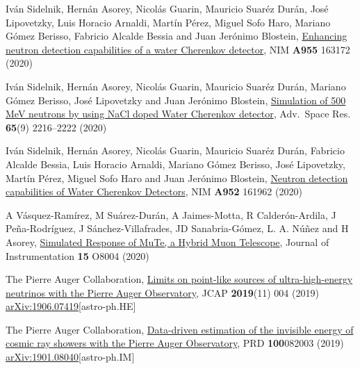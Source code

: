 \begin{etaremune}
\item {} Iván Sidelnik, Hernán Asorey, Nicolás Guarin, Mauricio Suaréz Durán, José Lipovetzky, Luis Horacio Arnaldi, Martín Pérez, Miguel Sofo Haro, Mariano Gómez Berisso, Fabricio Alcalde Bessia and Juan Jerónimo Blostein, \href{https://doi.org/10.1016/j.nima.2019.163172}{{Enhancing neutron detection capabilities of a water Cherenkov detector}}, NIM {\textbf{A955}} 163172 (2020) %
	
\item {} Iván Sidelnik, Hernán Asorey, Nicolás Guarin, Mauricio Suaréz Durán, Mariano Gómez Berisso, José Lipovetzky and Juan Jerónimo Blostein, \href{https://doi.org/10.1016/j.asr.2020.02.024}{{Simulation of 500 MeV neutrons by using NaCl doped Water Cherenkov detector}}, Adv.\ Space Res. {\textbf{65}}(9) 2216--2222 (2020) %

\item {} Iván Sidelnik, Hernán Asorey, Nicolás Guarin, Mauricio Suaréz Durán, Fabricio Alcalde Bessia, Luis Horacio Arnaldi, Mariano Gómez Berisso, José Lipovetzky, Martín Pérez, Miguel Sofo Haro and Juan Jerónimo Blostein, \href{https://doi.org/10.1016/j.nima.2019.03.017}{{Neutron detection capabilities of Water Cherenkov Detectors}}, NIM {\textbf{A952}} 161962 (2020) %

\item {} A Vásquez-Ramírez, M Suárez-Durán, A Jaimes-Motta, R Calderón-Ardila, J Peña-Rodríguez, J Sánchez-Villafrades, JD Sanabria-Gómez, L. A. Núñez and H Asorey, \href{https://doi.org/10.1088/1748-0221/15/08/P08004}{{Simulated Response of MuTe, a Hybrid Muon Telescope}}, Journal of Instrumentation {\textbf{15}} O8004 (2020) %

\item {}The Pierre Auger Collaboration, \href{https://doi.org/10.1088/1475-7516/2019/11/004}{{Limits on point-like sources of ultra-high-energy neutrinos with the Pierre Auger Observatory}}, JCAP {\textbf{2019}}(11) 004 (2019) \href{https://arxiv.org/abs/1906.07419}{arXiv:1906.07419}[astro-ph.HE]

\item {}The Pierre Auger Collaboration, \href{https://doi.org/10.1103/PhysRevD.100.082003}{Data-driven estimation of the invisible energy of cosmic ray showers with the Pierre Auger Observatory}, PRD {\textbf{100}}082003 (2019) \href{https://arxiv.org/abs/1901.08040}{arXiv:1901.08040}[astro-ph.IM]


\end{etaremune}
